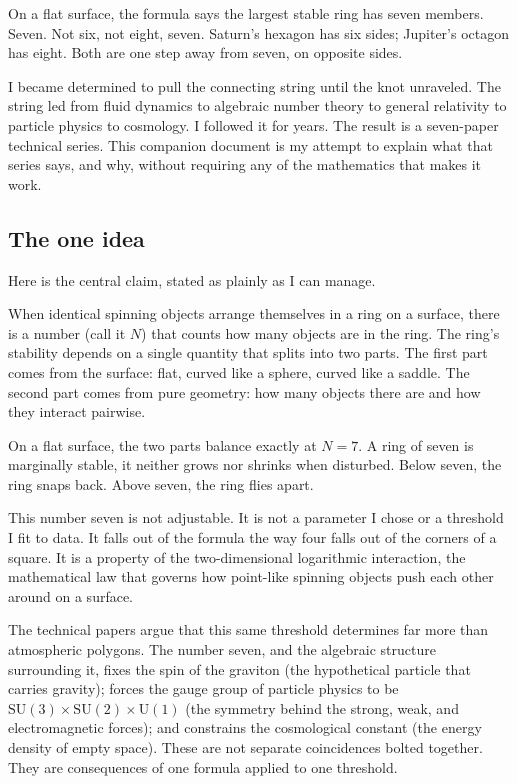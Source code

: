 On a flat surface, the formula says the largest stable ring has seven
members. Seven. Not six, not eight, seven. Saturn's hexagon has six
sides; Jupiter's octagon has eight. Both are one step away from seven,
on opposite sides.

I became determined to pull the connecting string until the knot
unraveled. The string led from fluid dynamics to algebraic number
theory to general relativity to particle physics to cosmology. I
followed it for years. The result is a seven-paper technical series.
This companion document is my attempt to explain what that series
says, and why, without requiring any of the mathematics that makes
it work.


\subsection*{The one idea}

Here is the central claim, stated as plainly as I can manage.

When identical spinning objects arrange themselves in a ring on a
surface, there is a number (call it $N$) that counts how many
objects are in the ring. The ring's stability depends on a single
quantity that splits into two parts. The first part comes from the
surface: flat, curved like a sphere, curved like a saddle. The
second part comes from pure geometry: how many objects there are and
how they interact pairwise.

On a flat surface, the two parts balance exactly at $N = 7$. A ring
of seven is marginally stable, it neither grows nor shrinks when
disturbed. Below seven, the ring snaps back. Above seven, the ring
flies apart.

This number seven is not adjustable. It is not a parameter I chose or
a threshold I fit to data. It falls out of the formula the way four
falls out of the corners of a square. It is a property of the
two-dimensional logarithmic interaction, the mathematical law that
governs how point-like spinning objects push each other around on a
surface.

The technical papers argue that this same threshold determines far
more than atmospheric polygons. The number seven, and the algebraic
structure surrounding it, fixes the spin of the graviton (the
hypothetical particle that carries gravity); forces the gauge group
of particle physics to be $\mathrm{SU}(3) \times \mathrm{SU}(2)
\times \mathrm{U}(1)$ (the symmetry behind the strong, weak, and
electromagnetic forces); and constrains the cosmological constant
(the energy density of empty space). These are not separate
coincidences bolted together. They are consequences of one formula
applied to one threshold.

